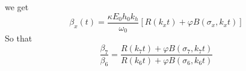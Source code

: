 \documentclass[aps,onecolumn,12pt]{revtex4}
\newcommand{\ih}{\ensuremath{\mathbf{H}}}
\begin{document}
we get
\begin{equation}
	\beta_x(t) =  \dfrac{\kappa E_0 h_0 k_h}{\omega_0} \left[
	R(k_xt) + \varphi B(\sigma_x,k_xt)
	\right]
\end{equation}
So that
\begin{equation}
	\dfrac{\beta_7}{\beta_6} = \dfrac{ R(k_7t) + \varphi B(\sigma_7,k_7t) }{R(k_6t) + \varphi B(\sigma_6,k_6t)}
\end{equation}

\end{document}
